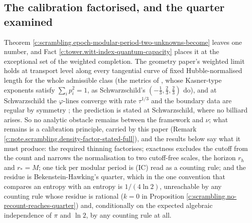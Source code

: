 \documentclass[11pt]{article}
\theoremstyle{definition}
\theoremstyle{plain}
\begin{document}
\subsection*{The calibration factorised, and the quarter examined}
\label{c:note.scrambling.setting-calibration-factorised-quarter-examined}
Theorem \ref{c:scrambling.epoch-modular-period-two-unknowns-become} leaves one number, and Fact \ref{c:tower.witt-index-quantum-capacity} places it at the exceptional set of the weighted completion. The geometry paper's weighted limit holds at transport level along every tangential curve of fixed Hubble-normalised length for the whole admissible class (the metrics of \cite[Def.~5.5]{ButlerT6}, whose Kasner-type exponents satisfy $\sum_i p_i^2 = 1$, as Schwarzschild's $(-\tfrac13, \tfrac23, \tfrac23)$ do), and at Schwarzschild the $\varphi$-lines converge with rate $\tau^{1/3}$ and the boundary data are regular by symmetry \cite[\S 5.5]{ButlerT6}; the prediction is stated at Schwarzschild, where no billiard arises. So no analytic obstacle remains between the framework and $\nu$; what remains is a calibration principle, carried by this paper (Remark \ref{c:note.scrambling.density-factor-stated-full}), and the results below say what it must produce: the required thinning factorises; exactness excludes the cutoff from the count and narrows the normalisation to two cutoff-free scales, the horizon $r_h$ and $r_* = M$; one tick per modular period is (IC) read as a counting rule; and the residue is Bekenstein-Hawking's quarter, which in the one convention that compares an entropy with an entropy is $1/(4\ln 2)$, unreachable by any counting rule whose residue is rational ($k = 0$ in Proposition \ref{c:scrambling.no-recount-reaches-quarter}) and, conditionally on the expected algebraic independence of $\pi$ and $\ln 2$, by any counting rule at all.
\end{document}
